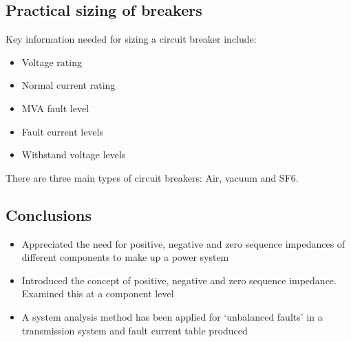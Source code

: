 \documentclass[class=report, crop=false, 12pt,a4paper]{standalone}
\begin{document}
\subsection{Practical sizing of breakers}
Key information needed for sizing a circuit breaker include:
\begin{itemize}
	\item Voltage rating
	\item Normal current rating
	\item MVA fault level
	\item Fault current levels
	\item Withstand voltage levels
\end{itemize}
There are three main types of circuit breakers: Air, vacuum and SF6. 
\subsection{Conclusions}
\begin{itemize}
	\item Appreciated the need for positive, negative and zero sequence impedances of different components to make up a power system
	\item Introduced the concept of positive, negative and zero sequence impedance. Examined this at a component level
	\item A system analysis method has been applied for `unbalanced faults' in a transmission system and fault current table produced
\end{itemize}
\end{document}

